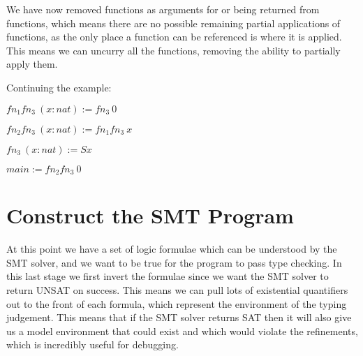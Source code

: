 \documentclass[12pt,a4paper,titlepage]{article}
\begin{document}
    We have now removed functions as arguments for or being returned from functions, which means there are no
    possible remaining partial applications of functions, as the only place a function can be referenced is where
    it is applied.
    This means we can uncurry all the functions, removing the ability to partially apply them.

    Continuing the example:

    $fn_1 fn_3\ (x: nat) := fn_3\ 0$

    $fn_2 fn_3\ (x: nat) := fn_1 fn_3\ x$

    $fn_3\ (x: nat) := S x$

    $main := fn_2 fn_3\ 0$

    \section{Construct the SMT Program}

    At this point we have a set of logic formulae which can be understood by the SMT solver, and we want to be
    true for the program to pass type checking.
    In this last stage we first invert the formulae since we want the SMT solver to return UNSAT on success.
    This means we can pull lots of existential quantifiers out to the front of each formula, which represent
    the environment of the typing judgement.
    This means that if the SMT solver returns SAT then it will also give us a model environment that could exist
    and which would violate the refinements, which is incredibly useful for debugging.
\end{document}
